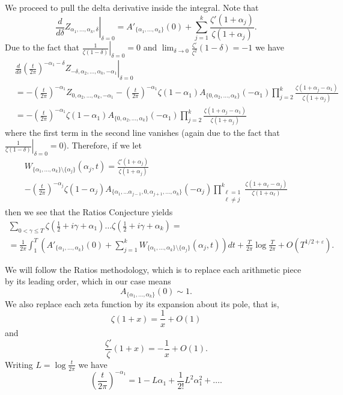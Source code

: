 \documentclass[12pt,a4paper,reqno]{amsart}
\theoremstyle{remark}
\numberwithin{equation}{section}
\begin{document}
We proceed to pull the delta derivative inside the integral. Note that
\[
\left. \frac{d}{d \delta} Z_{\alpha_1,\dots,\alpha_k,\delta} \right|_{\delta=0} =  A'_{\{\alpha_1,\dots,\alpha_k\}}(0) + \sum_{j=1}^k \frac{\zeta'(1+\alpha_j)}{\zeta(1+\alpha_j)}.
\]
Due to the fact that $\left. \frac{1}{\zeta(1-\delta)} \right|_{\delta=0} = 0$ and $\lim_{\delta\to0} \frac{\zeta'}{\zeta^2}(1-\delta)= -1$ we have
\begin{align*}
&\left. \frac{d}{d \delta} \left(\frac{t}{2 \pi} \right)^{-\alpha_1-\delta} Z_{-\delta,\alpha_2,\dots,\alpha_k,-\alpha_1} \right|_{\delta=0} \\
&= -\left(\frac{t}{2 \pi} \right)^{-\alpha_1} Z_{0,\alpha_2,\dots,\alpha_k,-\alpha_1} -\left(\frac{t}{2 \pi} \right)^{-\alpha_1} \zeta(1-\alpha_1) A_{\{0,\alpha_2,\dots,\alpha_k\}}(-\alpha_1) \prod_{j=2}^k \frac{\zeta(1+\alpha_j - \alpha_1)}{\zeta(1+\alpha_j)} \\
&= -\left(\frac{t}{2 \pi} \right)^{-\alpha_1} \zeta(1-\alpha_1) A_{\{0,\alpha_2,\dots,\alpha_k\}}(-\alpha_1) \prod_{j=2}^k \frac{\zeta(1+\alpha_j - \alpha_1)}{\zeta(1+\alpha_j)}
\end{align*}
where the first term in the second line vanishes (again due to the fact that $\left. \frac{1}{\zeta(1-\delta)} \right|_{\delta=0} = 0$). Therefore, if we let
\begin{multline*}
    W_{\{\alpha_1,\dots,\alpha_k\}\setminus \{ \alpha_j \}}(\alpha_j,t) = \frac{\zeta'(1+\alpha_j)}{\zeta(1+\alpha_j)}  \\
    - \left(\frac{t}{2 \pi} \right)^{-\alpha_j} \zeta(1-\alpha_j) A_{\{\alpha_1,\dots \alpha_{j-1}, 0 , \alpha_{j+1}, \dots ,\alpha_k\}}(-\alpha_j) \prod_{\substack{ \ell = 1\\ \ell \neq j}}^k \frac{\zeta(1+\alpha_\ell - \alpha_j)}{\zeta(1+\alpha_\ell)}
\end{multline*}
then we see that the Ratios Conjecture yields
\begin{multline}\label{eq:RatConW}
\sum_{0 < \gamma \leq T}  \zeta \left( \frac{1}{2} + i \gamma + \alpha_1 \right)\dots\zeta \left( \frac{1}{2} + i \gamma + \alpha_k \right) = \\
= \frac{1}{2 \pi} \int_{1}^{T} \left( A'_{\{\alpha_1,\dots,\alpha_k\}}(0) + \sum_{j=1}^k W_{\{\alpha_1,\dots,\alpha_k\}\setminus \{ \alpha_j \}}(\alpha_j,t)\right) dt + \frac{T}{2\pi} \log \frac{T}{2\pi}
+ O\left(T^{1/2 +\varepsilon}\right).
\end{multline}




We will follow the Ratios methodology, which is to replace each arithmetic piece by its leading order, which in our case means
\[
A_{\{\alpha_1,\dots,\alpha_k\}}(0) \sim 1.
\]
We also replace each zeta function by its expansion about its pole, that is,
\[
\zeta (1+x) = \frac{1}{x} + O(1)
\]
and
\[
\frac{\zeta '}{\zeta} (1+x) = -\frac{1}{x} + O(1).
\]
Writing $L=\log\frac{t}{2\pi}$ we have
\[
\left(\frac{t}{2 \pi} \right)^{-\alpha_1} = 1 - L \alpha_1 + \frac{1}{2!} L^2 \alpha_1^2 + \dots.
\]
\end{document}
